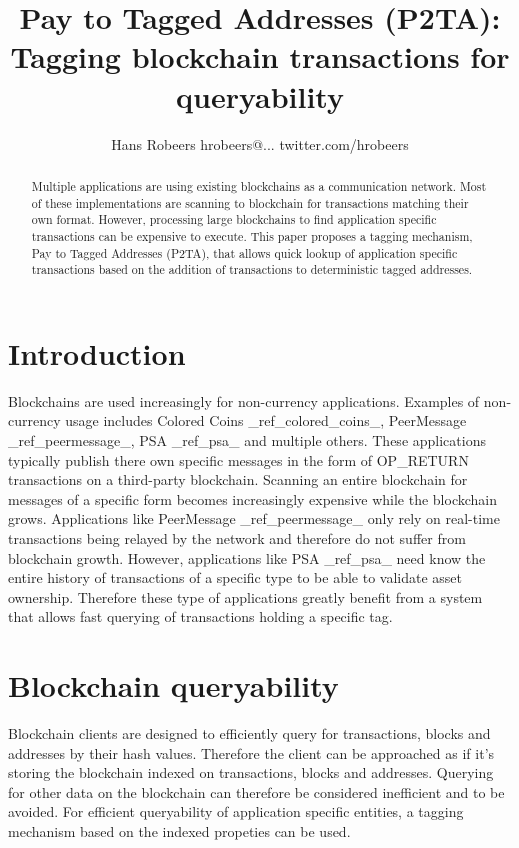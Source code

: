 \documentclass[a4paper,10pt]{article}
\title{Pay to Tagged Addresses (P2TA): Tagging blockchain transactions for queryability}
\author{Hans Robeers hrobeers@... twitter.com/hrobeers}
\begin{document}
\maketitle

\begin{abstract}
Multiple applications are using existing blockchains as a communication network.
Most of these implementations are scanning to blockchain for transactions matching their own format.
However, processing large blockchains to find application specific transactions can be expensive to execute.
This paper proposes a tagging mechanism, Pay to Tagged Addresses (P2TA), that allows quick lookup of application specific transactions based on the addition of transactions to deterministic tagged addresses.
\end{abstract}

\section{Introduction}
Blockchains are used increasingly for non-currency applications.
Examples of non-currency usage includes Colored Coins \_ref\_colored\_coins\_, PeerMessage \_ref\_peermessage\_, PSA \_ref\_psa\_ and multiple others.
These applications typically publish there own specific messages in the form of OP\_RETURN transactions on a third-party blockchain.
Scanning an entire blockchain for messages of a specific form becomes increasingly expensive while the blockchain grows.
Applications like PeerMessage \_ref\_peermessage\_ only rely on real-time transactions being relayed by the network and therefore do not suffer from blockchain growth.
However, applications like PSA \_ref\_psa\_ need know the entire history of transactions of a specific type to be able to validate asset ownership.
Therefore these type of applications greatly benefit from a system that allows fast querying of transactions holding a specific tag.

\section{Blockchain queryability}
Blockchain clients are designed to efficiently query for transactions, blocks and addresses by their hash values.
Therefore the client can be approached as if it's storing the blockchain indexed on transactions, blocks and addresses.
Querying for other data on the blockchain can therefore be considered inefficient and to be avoided.
For efficient queryability of application specific entities, a tagging mechanism based on the indexed propeties can be used.
\end{document}
